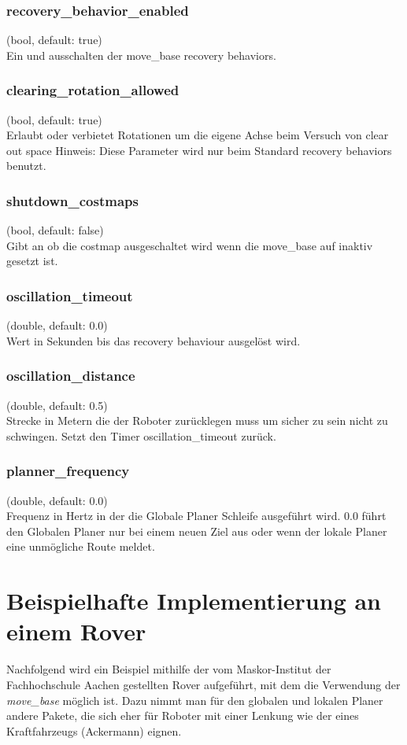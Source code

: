 \documentclass[oribibl]{llncs}
\begin{document}
\subsubsection{recovery\_behavior\_enabled} (bool, default: true)\\
	Ein und ausschalten der move\_base recovery behaviors.

\subsubsection{clearing\_rotation\_allowed} (bool, default: true)\\
	Erlaubt oder verbietet Rotationen um die eigene Achse beim Versuch von clear out space
	Hinweis: Diese Parameter wird nur beim Standard recovery behaviors benutzt.

\subsubsection{shutdown\_costmaps} (bool, default: false)\\
	Gibt an ob die costmap ausgeschaltet wird wenn die move\_base auf inaktiv gesetzt ist.
\subsubsection{oscillation\_timeout} (double, default: 0.0)\\
	Wert in Sekunden bis das recovery behaviour ausgelöst wird.
\subsubsection{oscillation\_distance} (double, default: 0.5)\\
	Strecke in Metern die der Roboter zurücklegen muss um sicher zu sein nicht zu schwingen. Setzt den Timer oscillation\_timeout zurück.
\subsubsection{planner\_frequency} (double, default: 0.0)\\
	Frequenz in Hertz in der die Globale Planer Schleife ausgeführt wird.
	0.0 führt den Globalen Planer nur bei einem neuen Ziel aus oder wenn der lokale Planer eine unmögliche Route meldet.	
\newpage
\section{Beispielhafte Implementierung an einem Rover}
Nachfolgend wird ein Beispiel mithilfe der vom Maskor-Institut der Fachhochschule Aachen gestellten Rover aufgeführt, mit dem die Verwendung der \textit{move\_base} möglich ist. Dazu nimmt man für den globalen und lokalen Planer andere Pakete, die sich eher für Roboter mit einer Lenkung wie der eines Kraftfahrzeugs (Ackermann) eignen.\\
\end{document}
